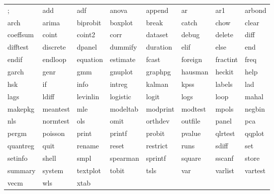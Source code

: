 \begin{tabular}{llllllll}
; & add & adf & anova & append & ar & ar1 & arbond \\
arch & arima & biprobit & boxplot & break & catch & chow & clear \\
coeffsum & coint & coint2 & corr & dataset & debug & delete & diff \\
difftest & discrete & dpanel & dummify & duration & elif & else & end \\
endif & endloop & equation & estimate & fcast & foreign & fractint & freq \\
garch & genr & gmm & gnuplot & graphpg & hausman & heckit & help \\
hsk & if & info & intreg & kalman & kpss & labels & lad \\
lags & ldiff & levinlin & logistic & logit & logs & loop & mahal \\
makepkg & meantest & mle & modeltab & modprint & modtest & mpols & negbin \\
nls & normtest & ols & omit & orthdev & outfile & panel & pca \\
pergm & poisson & print & printf & probit & pvalue & qlrtest & qqplot \\
quantreg & quit & rename & reset & restrict & runs & sdiff & set \\
setinfo & shell & smpl & spearman & sprintf & square & sscanf & store \\
summary & system & textplot & tobit & tsls & var & varlist & vartest \\
vecm & wls & xtab & \\
\end{tabular}

